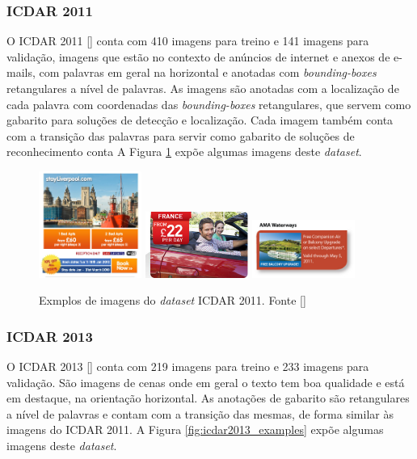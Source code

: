\subsubsection{ICDAR 2011}\label{sec:datasets_icdar2011}
O ICDAR 2011 [] conta com 410 imagens para treino e 141 imagens para validação, imagens que estão no contexto de anúncios de internet e anexos de e-mails, com palavras em geral na horizontal e anotadas com \textit{bounding-boxes} retangulares a nível de palavras. As imagens são anotadas com a localização de cada palavra com coordenadas das \textit{bounding-boxes} retangulares, que servem como gabarito para soluções de detecção e localização. Cada imagem também conta com a transição das palavras para servir como gabarito de soluções de reconhecimento conta A Figura \ref{fig:icdar2011_examples} expõe algumas imagens deste \textit{dataset}.

\begin{figure}
    \centering
    \includegraphics[width=0.3\textwidth]{figs/img_33.png}
    \includegraphics[width=0.3\textwidth]{figs/img_62.jpg}
    \includegraphics[width=0.3\textwidth]{figs/img_13.jpg}
    \caption{Exmplos de imagens do \textit{dataset} ICDAR 2011. Fonte []}
        \label{fig:icdar2011_examples}
\end{figure}

\subsubsection{ICDAR 2013}\label{sec:datasets_icdar2013}
O ICDAR 2013 [] conta com 219 imagens para treino e 233 imagens para validação. São imagens de cenas onde em geral o texto tem boa qualidade e está em destaque, na orientação horizontal. As anotações de gabarito são retangulares a nível de palavras e contam com a transição das mesmas, de forma similar às imagens do ICDAR 2011. A Figura \ref{fig:icdar2013_examples} expõe algumas imagens deste \textit{dataset}.

